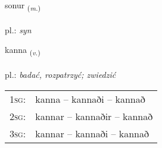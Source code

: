 \documentclass[frontgrid, backgrid]{flacards}\usepackage[]{graphicx}\usepackage[]{xcolor}
\begin{document}
\renewcommand{\blhead}{\vskip5pt {\small\bfseries\footnotesize Nafnorð | Noun }}
\renewcommand{\bcfoot}{\vskip5pt \hspace{2pt}{\small\bfseries\footnotesize 1K}}


{sonur \small{\textsubscript{(\textit{m.})}} \\[1ex] %
\textphonetic{[sɔːnʏr]} \\
pl.: \emph{syn} \\  [2ex]
\renewcommand*{\arraystretch}{0.8}
}

\renewcommand{\flhead}{\vskip5pt \fboxsep=0pt {\small\bfseries\footnotesize Sagnorð | Verb}}
\renewcommand{\fcfoot}{\vskip5pt \fboxsep=0pt \hspace{2pt}{\small\bfseries\footnotesize 1K}}

\renewcommand{\blhead}{\vskip5pt {\small\bfseries\footnotesize Sagnorð | Verb }}
\renewcommand{\bcfoot}{\vskip5pt \hspace{2pt}{\small\bfseries\footnotesize 1K}}


{kanna \small{\textsubscript{(\textit{v.})}} \\[1ex] %
\textphonetic{[kʰana]} \\
pl.: \emph{badać, rozpatrzyć; zwiedzić} \\  [2ex]
\renewcommand*{\arraystretch}{0.8}
\begin{tabular}{p{1cm}l}
\textsc{1sg}: & kanna -- kannaði -- kannað \\ 
\textsc{2sg}: & kannar -- kannaðir -- kannað \\ 
\textsc{3sg}: & kannar -- kannaði -- kannað \\ 
\end{tabular}
}

\renewcommand{\flhead}{\vskip5pt \fboxsep=0pt {\small\bfseries\footnotesize Nafnorð | Noun}}
\renewcommand{\fcfoot}{\vskip5pt \fboxsep=0pt \hspace{2pt}{\small\bfseries\footnotesize 1K}}
\end{document}
